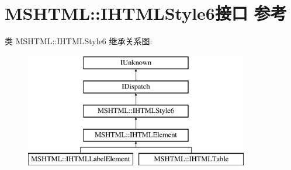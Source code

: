 \hypertarget{interface_m_s_h_t_m_l_1_1_i_h_t_m_l_style6}{}\section{M\+S\+H\+T\+ML\+:\+:I\+H\+T\+M\+L\+Style6接口 参考}
\label{interface_m_s_h_t_m_l_1_1_i_h_t_m_l_style6}
类 M\+S\+H\+T\+ML\+:\+:I\+H\+T\+M\+L\+Style6 继承关系图\+:\begin{figure}[H]
\begin{center}
\leavevmode
\includegraphics[height=5.000000cm]{interface_m_s_h_t_m_l_1_1_i_h_t_m_l_style6}
\end{center}
\end{figure}

